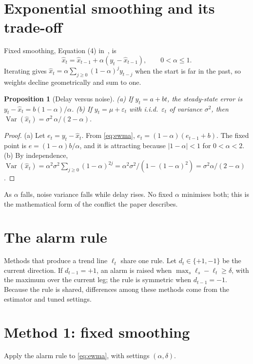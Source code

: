 \documentclass[12pt,a4paper]{report}
\newtheorem{proposition}{Proposition}[chapter]
\theoremstyle{definition}\newtheorem{definition}{Definition}[chapter]
\begin{document}
\section{Exponential smoothing and its trade-off}
Fixed smoothing, Equation (4) in~\cite{musaev2024}, is
\begin{equation}\hat x_t=\hat x_{t-1}+\alpha(y_t-\hat x_{t-1}),\qquad 0<\alpha\le 1.\label{eq:ewma}\end{equation}
Iterating gives $\hat x_t=\alpha\sum_{j\ge0}(1-\alpha)^j y_{t-j}$ when the start is far in the past, so weights decline geometrically and sum to one.
\begin{proposition}[Delay versus noise]\label{prop:tradeoff}
(a) If $y_t=a+bt$, the steady-state error is $y_t-\hat x_t=b(1-\alpha)/\alpha$. (b) If $y_t=\mu+\varepsilon_t$ with i.i.d.\ $\varepsilon_t$ of variance $\sigma^2$, then $\operatorname{Var}(\hat x_t)=\sigma^2\,\alpha/(2-\alpha)$.
\end{proposition}
\begin{proof}
(a) Let $e_t=y_t-\hat x_t$. From \eqref{eq:ewma}, $e_t=(1-\alpha)(e_{t-1}+b)$. The fixed point is $e=(1-\alpha)b/\alpha$, and it is attracting because $|1-\alpha|<1$ for $0<\alpha<2$.
(b) By independence, $\operatorname{Var}(\hat x_t)=\alpha^2\sigma^2\sum_{j\ge0}(1-\alpha)^{2j}=\alpha^2\sigma^2/(1-(1-\alpha)^2)=\sigma^2\alpha/(2-\alpha)$.
\end{proof}
\noindent As $\alpha$ falls, noise variance falls while delay rises. No fixed $\alpha$ minimises both; this is the mathematical form of the conflict the paper describes.

\section{The alarm rule}
Methods that produce a trend line $\ell_t$ share one rule. Let $d_t\in\{+1,-1\}$ be the current direction. If $d_{t-1}=+1$, an alarm is raised when $\max_{s}\ell_s-\ell_t\ge\delta$, with the maximum over the current leg; the rule is symmetric when $d_{t-1}=-1$. Because the rule is shared, differences among these methods come from the estimator and tuned settings.

\section{Method 1: fixed smoothing}
Apply the alarm rule to \eqref{eq:ewma}, with settings $(\alpha,\delta)$.
\end{document}
